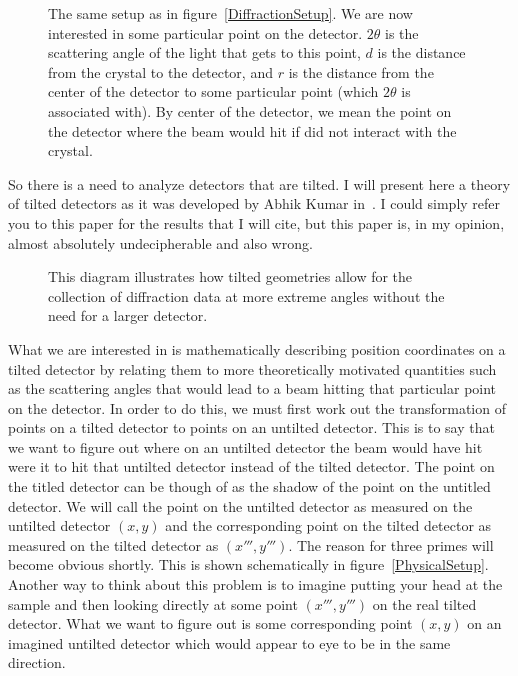 \begin{SCfigure}[1][tb]
    \centering
    
    \caption{The same setup as in figure~\ref{DiffractionSetup}. 
    We are now interested in some particular point on the 
    detector. $2\theta$ is the scattering angle of the light
    that gets to this point, $d$ is the distance 
    from the crystal to the detector, and $r$ is the distance 
    from the center of the detector to some particular point 
    (which $2\theta$ is associated with). By center 
    of the detector, we mean the point on the detector where 
    the beam would hit if did not interact with the crystal.}
    \label{MeasureAngleFlatDetector}
\end{SCfigure}


So there is a need to analyze detectors that are 
tilted. I will 
present here a theory of tilted detectors as it was 
developed by Abhik Kumar in~\cite{Kumar05}.
I could simply refer you to this paper for the results
that I will cite, but this paper is, in my opinion,
almost absolutely undecipherable and also wrong.

\begin{SCfigure}[1][tb]
    \centering
    
    \caption{This diagram illustrates how tilted geometries 
    allow for the collection of diffraction data at more 
    extreme angles without the need for a larger detector.}
    \label{HigherQValues}
\end{SCfigure}

What we are interested in is mathematically describing 
position coordinates on a tilted detector by relating 
them to more theoretically motivated quantities such as 
the scattering angles that would lead to a beam hitting
that particular point on the detector. 
In order to do this, we must first work
out the transformation of points on a tilted detector
to points on an untilted detector. This is to say
that we want to figure out where on an untilted 
detector the beam would have hit were it to hit
that untilted detector instead of the tilted detector.
The point on the titled detector can be though of
as the shadow of the point on the untitled detector.
We will call the point on the untilted detector
as measured on the untilted detector $(x,y)$ 
and the corresponding point on the tilted detector
as measured on the tilted detector as $(x''',y''')$. 
The reason for three primes will become obvious
shortly. This is shown schematically in 
figure~\ref{PhysicalSetup}. Another way to think
about this problem is to imagine putting your 
head at the sample and then looking directly 
at some point $(x''',y''')$ on the real
tilted detector. What we want to figure out
is some corresponding point $(x,y)$ on an 
imagined untilted 
detector which would appear to eye to be 
in the same direction.

